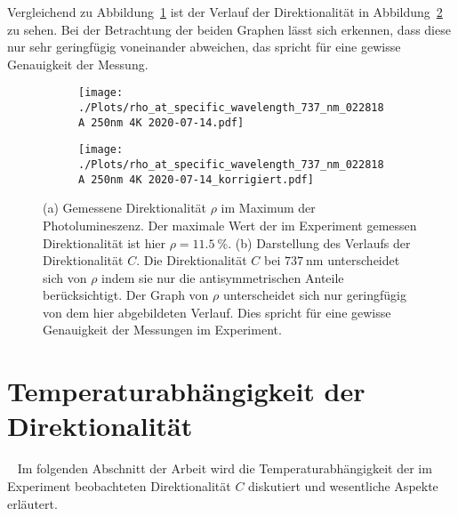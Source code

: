 Vergleichend zu Abbildung~\ref{fig:dir} ist der Verlauf der Direktionalität in Abbildung~\ref{fig:dir_kor} zu sehen.
Bei der Betrachtung der beiden Graphen lässt sich erkennen, dass diese nur sehr geringfügig voneinander 
abweichen, das spricht für eine gewisse Genauigkeit der Messung.
\begin{figure}
    \begin{subfigure}{0.50\textwidth}
        \texttt{[image: ./Plots/rho\_at\_specific\_wavelength\_737\_nm\_022818A 250nm 4K 2020-07-14.pdf]}
        \caption{}
        \label{fig:dir}
    \end{subfigure}
    \begin{subfigure}{0.50\textwidth}
        \texttt{[image: ./Plots/rho\_at\_specific\_wavelength\_737\_nm\_022818A 250nm 4K 2020-07-14\_korrigiert.pdf]}
        \caption{}
        \label{fig:dir_kor}
    \end{subfigure}
    \caption{(a) Gemessene Direktionalität $\rho$ im Maximum der Photolumineszenz.
    Der maximale Wert der im Experiment gemessen Direktionalität ist hier $\rho = \SI{11,5}{\percent}$.
     (b) Darstellung des Verlaufs der Direktionalität $C$.
     Die Direktionalität $C$ bei $\SI{737}{\nano\meter}$ unterscheidet sich von $\rho$ indem sie nur die antisymmetrischen
     Anteile berücksichtigt. Der Graph von $\rho$ unterscheidet sich nur geringfügig von dem hier 
     abgebildeten Verlauf. Dies spricht für eine gewisse Genauigkeit der Messungen im Experiment.}
    \label{fig:dir_merged}
\end{figure}
\FloatBarrier 

\section{Temperaturabhängigkeit der Direktionalität}~\label{sec:Temperatur Abhaengigkeit der Direktionalitaet}
Im folgenden Abschnitt der Arbeit wird die Temperaturabhängigkeit der im Experiment
beobachteten Direktionalität $C$ diskutiert und wesentliche Aspekte erläutert.

